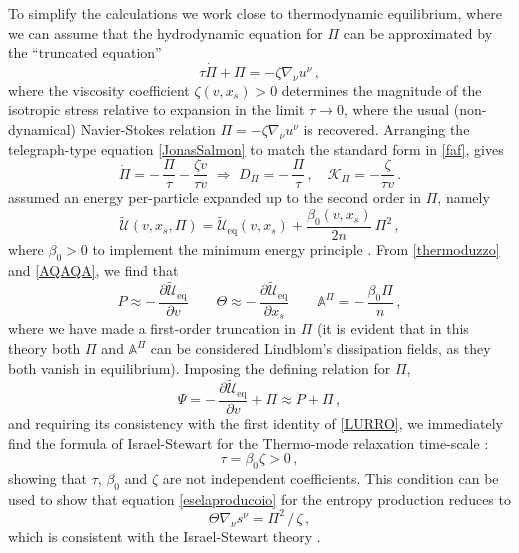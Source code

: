 \documentclass[a4paper, amsfonts, amssymb, amsmath, reprint, twocolumn, showkeys, nofootinbib]{revtex4-2}
\begin{document}
To simplify the calculations we work close to thermodynamic equilibrium, where we can assume that the hydrodynamic equation for $\Pi$ can be approximated by the ``truncated equation'' \citep{Salmonson1991,Zakari1993,Maartens1995}
\begin{equation}
\label{JonasSalmon}
\tau \dot{\Pi} + \Pi = -\zeta \nabla_\nu u^\nu \, , 
\end{equation} 
where the viscosity coefficient $\zeta(v, x_s)>0$ determines the magnitude of the isotropic stress relative to expansion in the limit $\tau\rightarrow0$, where the usual (non-dynamical) Navier-Stokes relation $\Pi = -\zeta \nabla_\nu u^\nu$ is recovered.
Arranging the telegraph-type equation \eqref{JonasSalmon} to match the standard form in \eqref{faf}, gives
\begin{equation}
\dot{\Pi} = - \, \dfrac{\Pi}{\tau} - \dfrac{\zeta \dot{v}}{\tau v} 
 \, \, \Rightarrow   \, \,  
D_\Pi = - \, \dfrac{\Pi}{\tau} \, , \quad 
\mathcal{K}_\Pi = - \dfrac{\zeta }{\tau v} \, .
\end{equation}
\citet{Israel_Stewart_1979} assumed an energy per-particle expanded up to the second order in $\Pi$, namely
\begin{equation}
\tilde{\mathcal{U}}(v,x_s,\Pi)= \tilde{\mathcal{U}}_{\text{eq}}(v,x_s) + \dfrac{\beta_0(v,x_s) }{2n} \, \Pi^2 \, ,
\end{equation}
where $\beta_0 > 0$ to implement the minimum energy principle \cite{Callen_book}.
From \eqref{thermoduzzo} and \eqref{AQAQA}, we find that
\begin{equation}
P\approx - \, \dfrac{\partial \tilde{\mathcal{U}}_{\text{eq}}}{\partial v}  
\quad \quad  
\Theta \approx - \, \dfrac{\partial \tilde{\mathcal{U}}_{\text{eq}}}{\partial x_s}  
\quad \quad   
\mathbb{A}^\Pi = - \, \dfrac{\beta_0 \Pi}{n} \, ,
\end{equation}
where we have made a first-order truncation in $\Pi$ (it is evident that in this theory both $\Pi$ and $\mathbb{A}^\Pi$ can be considered Lindblom's dissipation fields, as they both vanish in equilibrium). Imposing the defining relation for $\Pi$,
\begin{equation}
\Psi = - \, \dfrac{\partial \tilde{\mathcal{U}}_{\text{eq}}}{\partial v}  +\Pi \approx P+\Pi \, ,
\end{equation}
and requiring its consistency with the first identity of \eqref{LURRO}, we immediately find the formula of Israel-Stewart for the Thermo-mode relaxation time-scale \cite{rezzolla_book}:
\begin{equation}
\label{JonasSmargiasso}
\tau = \beta_0  \zeta >0 \, ,
\end{equation}
showing that $\tau$, $\beta_0$ and $\zeta$ are not independent coefficients. This condition can be used to show that equation \eqref{eselaproducoio} for the entropy production reduces to
\begin{equation}\label{quandoIsrproduceentrop}
\Theta \nabla_\nu s^\nu = {\Pi^2} \, / \, \zeta \, ,
\end{equation}
which is consistent with the Israel-Stewart theory \citep{Hishcock1983}. 
\end{document}
